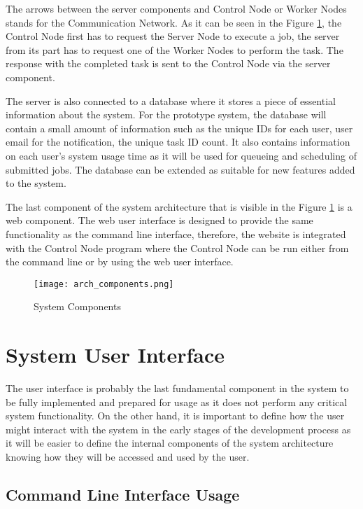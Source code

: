 \documentclass[10pt]{report}
\begin{document}
The arrows between the server components and Control Node or Worker Nodes stands for the Communication Network. As it can be seen in the Figure \ref{fig:comps}, the Control Node first has to request the Server Node to execute a job, the server from its part has to request one of the Worker Nodes to perform the task. The response with the completed task is sent to the Control Node via the server component.
\newline

The server is also connected to a database where it stores a piece of essential information about the system. For the prototype system, the database will contain a small amount of information such as the unique IDs for each user, user email for the notification, the unique task ID count. It also contains information on each user's system usage time as it will be used for queueing and scheduling of submitted jobs. The database can be extended as suitable for new features added to the system.
\newline

The last component of the system architecture that is visible in the Figure \ref{fig:comps} is a web component. The web user interface is designed to provide the same functionality as the command line interface, therefore, the website is integrated with the Control Node program where the Control Node can be run either from the command line or by using the web user interface.

\begin{figure}[htp]
    \centering
    \texttt{[image: arch\_components.png]}
    \caption{System Components}
    \label{fig:comps}
\end{figure}


\section{System User Interface}

The user interface is probably the last fundamental component in the system to be fully implemented and prepared for usage as it does not perform any critical system functionality. On the other hand, it is important to define how the user might interact with the system in the early stages of the development process as it will be easier to define the internal components of the system architecture knowing how they will be accessed and used by the user.


\subsection{Command Line Interface Usage}
\end{document}
